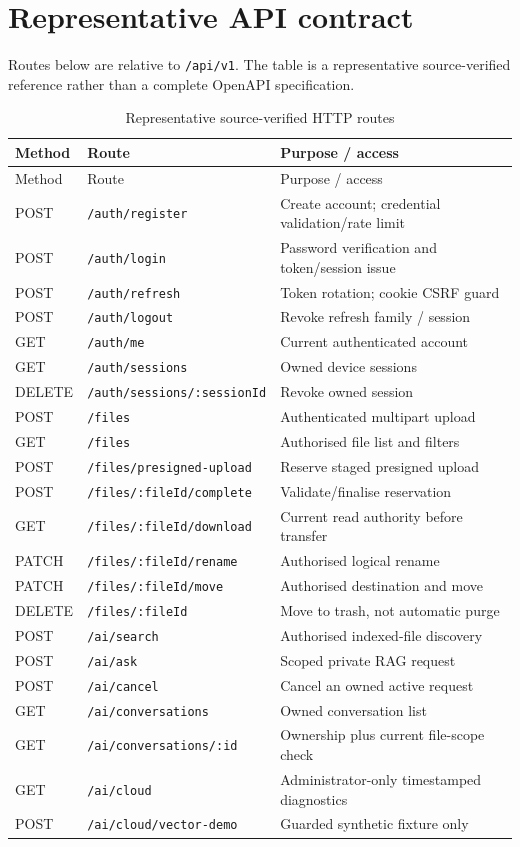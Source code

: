 \documentclass[11pt,a4paper,oneside]{report}
\begin{document}
\section{Representative API contract}
Routes below are relative to \texttt{/api/v1}. The table is a representative source-verified reference rather than a complete OpenAPI specification.
\begin{longtable}{p{.12\linewidth}p{.35\linewidth}p{.43\linewidth}}
\caption{Representative source-verified HTTP routes}\\\toprule Method&Route&Purpose / access\\\midrule\endfirsthead\toprule Method&Route&Purpose / access\\\midrule\endhead
POST&\texttt{/auth/register}&Create account; credential validation/rate limit\\
POST&\texttt{/auth/login}&Password verification and token/session issue\\
POST&\texttt{/auth/refresh}&Token rotation; cookie CSRF guard\\
POST&\texttt{/auth/logout}&Revoke refresh family / session\\
GET&\texttt{/auth/me}&Current authenticated account\\
GET&\texttt{/auth/sessions}&Owned device sessions\\
DELETE&\texttt{/auth/sessions/:sessionId}&Revoke owned session\\
POST&\texttt{/files}&Authenticated multipart upload\\
GET&\texttt{/files}&Authorised file list and filters\\
POST&\texttt{/files/presigned-upload}&Reserve staged presigned upload\\
POST&\texttt{/files/:fileId/complete}&Validate/finalise reservation\\
GET&\texttt{/files/:fileId/download}&Current read authority before transfer\\
PATCH&\texttt{/files/:fileId/rename}&Authorised logical rename\\
PATCH&\texttt{/files/:fileId/move}&Authorised destination and move\\
DELETE&\texttt{/files/:fileId}&Move to trash, not automatic purge\\
POST&\texttt{/ai/search}&Authorised indexed-file discovery\\
POST&\texttt{/ai/ask}&Scoped private RAG request\\
POST&\texttt{/ai/cancel}&Cancel an owned active request\\
GET&\texttt{/ai/conversations}&Owned conversation list\\
GET&\texttt{/ai/conversations/:id}&Ownership plus current file-scope check\\
GET&\texttt{/ai/cloud}&Administrator-only timestamped diagnostics\\
POST&\texttt{/ai/cloud/vector-demo}&Guarded synthetic fixture only\\\bottomrule
\end{longtable}
\end{document}
